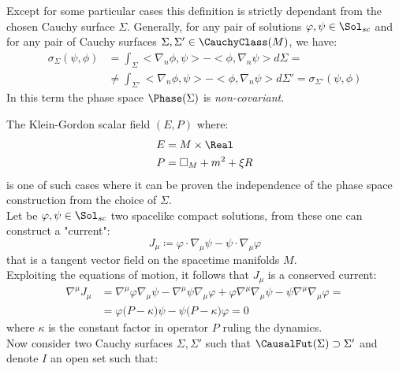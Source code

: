 \documentclass[Main]{subfiles}
\begin{document}
			Except for some particular cases this definition is strictly dependant from the chosen Cauchy surface $\Sigma$.
			Generally, for any pair of solutions $\varphi, \psi \in \Sol_{sc}$ and for any pair of Cauchy surfaces 	$\Sigma, \Sigma' \in \CauchyClass(M)$, we have:
						\begin{align*}
							\sigma_\Sigma ( \psi, \phi) &= \int_\Sigma < \nabla_n \phi, \psi>  - <\phi, \nabla_n \psi > d\Sigma=\\
							&\neq \int_{\Sigma'} < \nabla_n \phi, \psi>  - <\phi, \nabla_n \psi > d\Sigma'= \sigma_{\Sigma'}(\psi,\phi)
						\end{align*}
		  In this term the phase space $\Phase(\Sigma)$ is \emph{non-covariant}.
		  
		\begin{example}\label{Ex:IndipendentPhaseSpace}
			The Klein-Gordon scalar field $(E,P)$ where:
			\begin{eqnarray}
				E &= M \times \Real \nonumber\\
				P &= \square_M + m^2 + \xi R \label{Eq:KGOperator}
			\end{eqnarray}
			is one of such cases where it can be proven the independence of the phase space construction from the choice of $\Sigma$.
			\\
			Let be $\varphi, \psi \in \Sol_{sc}$ two spacelike compact solutions, from these one can construct a "current":
			\begin{displaymath}
					J_\mu \coloneqq \varphi \cdot \nabla_\mu \psi  - \psi \cdot \nabla_\mu \varphi
			\end{displaymath}
			that is a tangent vector field on the spacetime manifolds $M$.			
			\\
			Exploiting the equations of motion, it follows that $J_\mu$ is a conserved current:
			\begin{eqnarray}\label{Eq:ScalarCurrent}
				\nabla^\mu J_\mu &= \nabla^\mu\varphi \nabla_\mu\psi  - \nabla^\mu \psi \nabla_\mu \varphi + 
				\varphi \nabla^\mu \nabla_\mu \psi - \psi \nabla^\mu \nabla_\mu \varphi	= \nonumber \\
				&=  \varphi \big( P - \kappa \big) \psi - \psi \big( P - \kappa \big) \varphi = 0 
			\end{eqnarray}
			where $\kappa$ is the constant factor in operator $P$ ruling the dynamics.
			\\
			Now consider two Cauchy surfaces $\Sigma, \Sigma'$ such that $\CausalFut(\Sigma) \supset \Sigma'$ and denote $I$ an open set such that:
			\begin{displaymath}

\end{displaymath}
\end{example}
\end{document}
